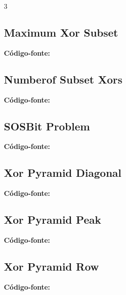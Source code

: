 \documentclass[8pt]{extarticle}
\begin{document}
\begin{multicols*}{3}
\subsection{Maximum Xor Subset}
\begin{caixaenunciado}

\end{caixaenunciado}
\vspace{0.3cm}
\noindent\textbf{Código-fonte:}


\subsection{Numberof Subset Xors}
\begin{caixaenunciado}

\end{caixaenunciado}
\vspace{0.3cm}
\noindent\textbf{Código-fonte:}


\subsection{SOSBit Problem}
\begin{caixaenunciado}

\end{caixaenunciado}
\vspace{0.3cm}
\noindent\textbf{Código-fonte:}


\subsection{Xor Pyramid Diagonal}
\begin{caixaenunciado}

\end{caixaenunciado}
\vspace{0.3cm}
\noindent\textbf{Código-fonte:}


\subsection{Xor Pyramid Peak}
\begin{caixaenunciado}

\end{caixaenunciado}
\vspace{0.3cm}
\noindent\textbf{Código-fonte:}


\subsection{Xor Pyramid Row}
\begin{caixaenunciado}

\end{caixaenunciado}
\vspace{0.3cm}
\noindent\textbf{Código-fonte:}

\end{multicols*}
\end{document}
